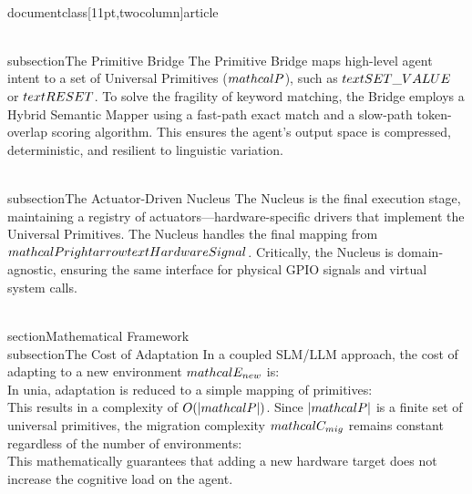 \\documentclass[11pt,twocolumn]{article}
\begin{document}
\\subsection{The Primitive Bridge}
The Primitive Bridge maps high-level agent intent to a set of Universal Primitives ($\\mathcal{P}$), such as $\\text{SET\_VALUE}$ or $\\text{RESET}$. To solve the fragility of keyword matching, the Bridge employs a Hybrid Semantic Mapper using a fast-path exact match and a slow-path token-overlap scoring algorithm. This ensures the agent's output space is compressed, deterministic, and resilient to linguistic variation.

\\subsection{The Actuator-Driven Nucleus}
The Nucleus is the final execution stage, maintaining a registry of actuators—hardware-specific drivers that implement the Universal Primitives. The Nucleus handles the final mapping from $\\mathcal{P} \\rightarrow \\text{Hardware Signal}$. Critically, the Nucleus is domain-agnostic, ensuring the same interface for physical GPIO signals and virtual system calls.

\\section{Mathematical Framework}
\\subsection{The Cost of Adaptation}
In a coupled SLM/LLM approach, the cost of adapting to a new environment $\\mathcal{E}_{new}$ is:
\\[ \\mathcal{C}_{coupled} = \\int_{t_0}^{t_f} ( \\mathcal{L}(\\theta, \\mathcal{D}_{new}) + \\lambda \\mathcal{R}(\\theta_{old}, \\theta_{new}) ) dt \\]
In unia, adaptation is reduced to a simple mapping of primitives:
\\[ \\mathcal{C}_{unia} = \\sum_{p \\in \\mathcal{P}} \\delta(p \\rightarrow a_{target}) \\]
This results in a complexity of $O(|\\mathcal{P}|)$. Since $|\\mathcal{P}|$ is a finite set of universal primitives, the migration complexity $\\mathcal{C}_{mig}$ remains constant regardless of the number of environments:
\\[ \\mathcal{C}_{mig} = O(1) \\]
This mathematically guarantees that adding a new hardware target does not increase the cognitive load on the agent.
\end{document}
